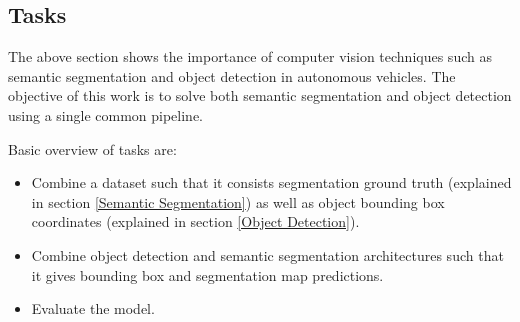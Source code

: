 \subsection{Tasks}
The above section shows the importance of computer vision techniques such as semantic segmentation and object detection in autonomous vehicles. The objective of this work is to solve both semantic segmentation and object detection using a single common pipeline.

\par

Basic overview of tasks are: 

\begin{itemize}
    \item Combine a dataset such that it consists segmentation ground truth (explained in section \ref{Semantic Segmentation}) as well as object bounding box coordinates (explained in section \ref{Object Detection}).
    \item Combine object detection and semantic segmentation architectures such that it gives bounding box and segmentation map predictions. 
    \item Evaluate the model. 
\end{itemize}

\afterpage{\null\newpage}

